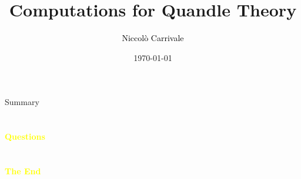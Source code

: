 \documentclass[aspectratio=43]{beamer}
\title{Computations for Quandle Theory} %
\subtitle{}
\author[N. Carrivale]{\textcolor{black}{Niccolò Carrivale}}
\institute[Radboud University]{
    \textcolor{black}{Faculty of Science}%
    \\%
    \textcolor{black}{Radboud University}%
    \\%
    \textcolor{black}{Nijmegen, The Netherlands}%
}
\date{\today}
\begin{document}
    
    \frame{\titlepage}
    
    \begin{frame}{Summary}
        \tableofcontents
    \end{frame}
    

    


  \section{}
    \begin{frame}{}
        \centering
            \Huge\bfseries
        \textcolor{yellow}{Questions}
        
    \end{frame}
    
    \section{}
    \begin{frame}{}
        \centering
            \Huge\bfseries
        \textcolor{yellow}{The End}
        
    \end{frame}
\end{document}
